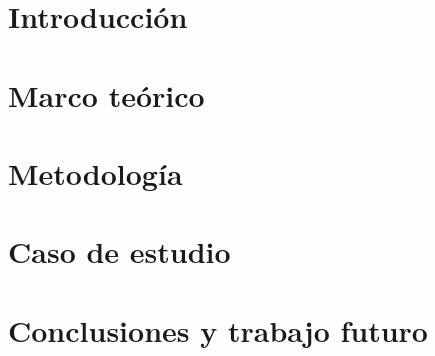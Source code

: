 \documentclass[letterpaper,12pt,oneside]{book} %
\begin{document}




\hypersetup{
    citecolor=Blue
}

\chapter{Introducción}
\label{ch:introduction}


\chapter{Marco teórico}
\label{ch:theorethical_framework}


\chapter{Metodología}
\label{ch:methodology}


\chapter{Caso de estudio}
\label{ch:case_study}


\chapter{Conclusiones y trabajo futuro}
\label{ch:conclusion}




\end{document}

